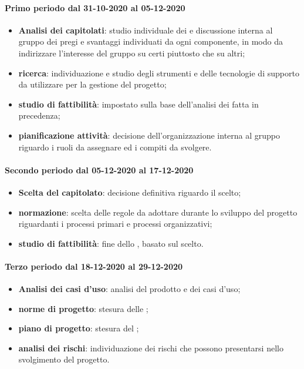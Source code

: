 \paragraph{Primo periodo dal 31-10-2020 al 05-12-2020}
\begin{itemize}
	\item \textbf{Analisi dei capitolati}: studio individuale dei  e discussione interna al gruppo dei pregi e svantaggi individuati da ogni componente, in modo da indirizzare l’interesse del gruppo su certi  piuttosto che su altri;
	\item \textbf{ricerca}: individuazione e studio degli strumenti e delle tecnologie di supporto da utilizzare per la gestione del progetto;
	\item \textbf{studio di fattibilità}: impostato sulla base dell'analisi dei  fatta in precedenza;
	\item \textbf{pianificazione attività}: decisione dell'organizzazione interna al gruppo riguardo i ruoli da assegnare ed i compiti da svolgere.
\end{itemize}

\paragraph{Secondo periodo dal 05-12-2020 al 17-12-2020}
\begin{itemize}
	\item \textbf{Scelta del capitolato}: decisione definitiva riguardo il  scelto;
	\item \textbf{normazione}: scelta delle regole da adottare durante lo sviluppo del progetto riguardanti i processi primari e processi organizzativi;
	\item \textbf{studio di fattibilità}: fine dello , basato sul  scelto.
\end{itemize}

\paragraph{Terzo periodo dal 18-12-2020 al 29-12-2020}
\begin{itemize}
	\item \textbf{Analisi dei casi d'uso}: analisi del prodotto e dei casi d’uso;
	\item \textbf{norme di progetto}: stesura delle ;
	\item \textbf{piano di progetto}: stesura del ;
	\item \textbf{analisi dei rischi}: individuazione dei rischi che possono presentarsi nello svolgimento del progetto.
\end{itemize}

